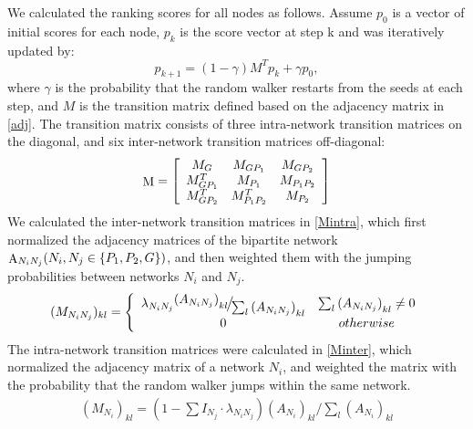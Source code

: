 We calculated the ranking scores for all nodes as follows.
Assume $p_0$ is a vector of initial scores for each node,
$p_k$ is the score vector at step k and was iteratively updated by:
\begin{equation}\label{rw}
{p_{k + 1}} = (1 - \gamma ){M^T}{p_k} + \gamma {p_0},
\end{equation}
where $\gamma$ is the probability that the random walker restarts
from the seeds at each step, and $M$ is the transition matrix defined
based on the adjacency matrix in \eqref{adj}.
The transition matrix consists of three intra-network transition
matrices on the diagonal, and six inter-network transition matrices off-diagonal:
\begin{equation}
{\mathop{\rm M}\nolimits}  = \left[ {\begin{array}{*{20}{c}}
{{M_G}}&{{M_{G{P_1}}}}&{{M_{G{P_2}}}}\\
{M_{G{P_1}}^T}&{{M_{{P_1}}}}&{{M_{{P_1}{P_2}}}}\\
{M_{G{P_2}}^T}&{M_{{P_1}{P_2}}^T}&{{M_{{P_2}}}}
\end{array}} \right]
\end{equation}
We calculated the inter-network transition matrices in \eqref{Mintra},
which first normalized the adjacency matrices of the bipartite network
${{\mathop{\rm A}\nolimits} _{{N_i}{N_j}}}({N_i},{N_j} \in \{ {P_1},{P_2},G\} )$,
and then weighted them with the jumping probabilities between networks $N_i$ and $N_j$.
\begin{equation}\label{Mintra}
{({M_{{N_i}{N_j}}})_{kl}} = \left\{ {\begin{array}{*{20}{c}}
{{\lambda _{{N_i}{N_j}}}{\raise0.7ex\hbox{${{{({A_{{N_i}{N_j}}})}_{kl}}}$} \!\mathord{\left/
 {\vphantom {{{{({A_{{N_i}{N_j}}})}_{kl}}} {\sum\nolimits_l {{{({A_{{N_i}{N_j}}})}_{kl}}} }}}\right.\kern-\nulldelimiterspace}
\!\lower0.7ex\hbox{${\sum\nolimits_l {{{({A_{{N_i}{N_j}}})}_{kl}}} }$}}}&{\sum\nolimits_l {{{({A_{{N_i}{N_j}}})}_{kl}}}  \ne 0}\\
0&{otherwise}
\end{array}} \right.
\end{equation}
The intra-network transition matrices were calculated in \eqref{Minter},
which normalized the adjacency matrix of a network $N_i$,
and weighted the matrix with the probability that the random walker
jumps within the same network.
\begin{equation}\label{Minter}
\begin{split}
{({M_{{N_i}}})_{kl}} = (1 - \sum {I_{N_j}}  \cdot {\lambda _{{N_i}{N_j}}}){({A_{{N_i}}})_{kl}}/\sum\nolimits_l {{{({A_{{N_i}}})}_{kl}}} %
\end{split}
\end{equation}
